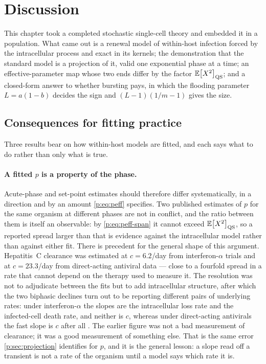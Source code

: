 \section{Discussion}
\label{p:sec:discussion}

This chapter took a completed stochastic single-cell theory and embedded it
in a population. What came out is a renewal model of within-host infection
forced by the intracellular process and exact in its kernels; the
demonstration that the standard model is a projection of it, valid one
exponential phase at a time; an effective-parameter map whose two ends
differ by the factor $\mathbb{E}\!\left[X^2\right]_{\rm QS}$; and a closed-form answer to
whether bursting pays, in which the flooding parameter $L=a(1-b)$ decides
the sign and $(L-1)(1/m-1)$ gives the size.

\subsection{Consequences for fitting practice}
\label{p:sec:fitting-consequences}

Three results bear on how within-host models are fitted, and each says what
to do rather than only what is true.

\paragraph{A fitted $p$ is a property of the phase.} Acute-phase and
set-point estimates should therefore differ systematically, in a direction
and by an amount \cref{p:eq:peff} specifies. Two published estimates of $p$
for the same organism at different phases are not in conflict, and the ratio
between them is itself an observable: by \cref{p:eq:peff-span} it cannot
exceed $\mathbb{E}\!\left[X^2\right]_{\rm QS}$, so a reported spread larger than that is
evidence against the intracellular model rather than against either fit.
There is precedent for the general shape of this argument. Hepatitis~C
clearance was estimated at $c=6.2$/day from interferon-$\alpha$ trials
\cite{neumann1998hepatitis} and at $c=23.3$/day from direct-acting antiviral
data \cite{guedj2013modeling} --- close to a fourfold spread in a rate that
cannot depend on the therapy used to measure it. The resolution was not to
adjudicate between the fits but to add intracellular structure, after which
the two biphasic declines turn out to be reporting different pairs of
underlying rates: under interferon-$\alpha$ the slopes are the intracellular
loss rate and the infected-cell death rate, and neither is $c$, whereas
under direct-acting antivirals the fast slope is $c$ after all
\cite{rong2013mathematical}. The earlier figure was not a bad measurement of
clearance; it was a good measurement of something else. That is the same
error \cref{p:sec:projection} identifies for $p$, and it is the general
lesson: a slope read off a transient is not a rate of the organism until a
model says which rate it is.

